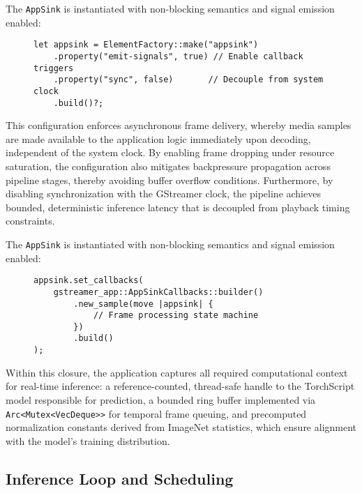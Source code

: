 The \texttt{AppSink} is instantiated with non-blocking semantics and signal emission enabled:

\begin{figure}[htbp]
\centering
\begin{verbatim}
let appsink = ElementFactory::make("appsink")
    .property("emit-signals", true) // Enable callback triggers
    .property("sync", false)       // Decouple from system clock
    .build()?;
\end{verbatim}
\label{lst:appsink_config}
\end{figure}

This configuration enforces asynchronous frame delivery, whereby media samples are made available to the application logic immediately upon decoding, independent of the system clock. By enabling frame dropping under resource saturation, the configuration also mitigates backpressure propagation across pipeline stages, thereby avoiding buffer overflow conditions. Furthermore, by disabling synchronization with the GStreamer clock, the pipeline achieves bounded, deterministic inference latency that is decoupled from playback timing constraints.

The \texttt{AppSink} is instantiated with non-blocking semantics and signal emission enabled:

\begin{figure}[htbp]
\centering
\begin{verbatim}
appsink.set_callbacks(
    gstreamer_app::AppSinkCallbacks::builder()
        .new_sample(move |appsink| {
            // Frame processing state machine
        })
        .build()
);
\end{verbatim}
\label{lst:appsink_callbacks}
\end{figure}

Within this closure, the application captures all required computational context for real-time inference: a reference-counted, thread-safe handle to the TorchScript model responsible for prediction, a bounded ring buffer implemented via \texttt{Arc<Mutex<VecDeque>>} for temporal frame queuing, and precomputed normalization constants derived from ImageNet statistics, which ensure alignment with the model's training distribution.

\subsection{Inference Loop and Scheduling}
\label{sec:inference_loop}

